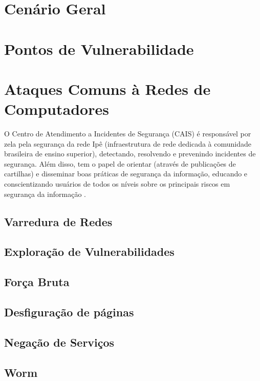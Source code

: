 \documentclass[
	12pt,				
	openright,		
	twoside,	
	a4paper,
	english,	
	brazil	
	]{abntex2}
\begin{document}
\section{Cenário Geral} \label{sec:geral}
\section{Pontos de Vulnerabilidade} \label{sec:vulnerabilidade}
\section{Ataques Comuns à Redes de Computadores} \label{sec:ataques}

O Centro de Atendimento a Incidentes de Segurança (CAIS) é responsável por zela pela segurança da rede Ipê (infraestrutura de rede dedicada à comunidade brasileira de ensino superior), detectando, resolvendo e prevenindo incidentes de segurança. Além disso, tem o papel de orientar (através de publicações de cartilhas) e disseminar boas práticas de segurança da informação, educando e conscientizando usuários de todos os níveis sobre os principais riscos em segurança da informação \cite{cais}.



\subsection{Varredura de Redes} \label{sec:varredura}
\subsection{Exploração de Vulnerabilidades} \label{sec:exploração}
\subsection{Força Bruta} \label{sec:forçabruta}
\subsection{Desfiguração de páginas} \label{sec:desfiguração}
\subsection{Negação de Serviços} \label{sec:negação}
\subsection{Worm} \label{sec:worm}
\end{document}
